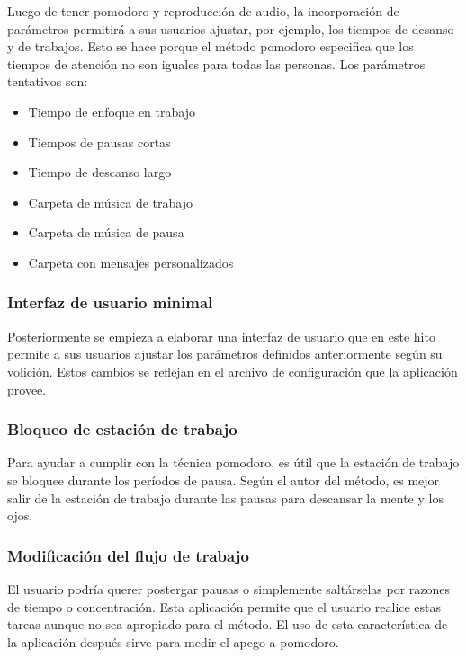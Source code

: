 \documentclass[12pt,letterpaper]{report}
\providecommand{\tightlist}{%
  \setlength{\itemsep}{0pt}\setlength{\parskip}{0pt}}
\begin{document}
Luego de tener pomodoro y reproducción de audio, la incorporación de parámetros permitirá a sus usuarios ajustar, por
ejemplo, los tiempos de desanso y de trabajos. Esto se hace porque el método pomodoro especifica que los tiempos de
atención no son iguales para todas las personas. Los parámetros tentativos son:

\begin{itemize}\tightlist{}
  \item Tiempo de enfoque en trabajo
  \item Tiempos de pausas cortas
  \item Tiempo de descanso largo
  \item Carpeta de música de trabajo
  \item Carpeta de música de pausa
  \item Carpeta con mensajes personalizados
\end{itemize}

\subsubsection{Interfaz de usuario minimal}

Posteriormente se empieza a elaborar una interfaz de usuario que en este hito permite a sus usuarios ajustar los
parámetros definidos anteriormente según su volición. Estos cambios se reflejan en el archivo de configuración que la
aplicación provee.

\subsubsection{Bloqueo de estación de trabajo}

Para ayudar a cumplir con la técnica pomodoro, es útil que la estación de trabajo se bloquee durante los períodos de
pausa. Según el autor del método, es mejor salir de la estación de trabajo durante las pausas para descansar la mente y
los ojos.

\subsubsection{Modificación del flujo de trabajo}

El usuario podría querer postergar pausas o simplemente saltárselas por razones de tiempo o concentración. Esta
aplicación permite que el usuario realice estas tareas aunque no sea apropiado para el método. El uso de esta
característica de la aplicación después sirve para medir el apego a pomodoro.
\end{document}
